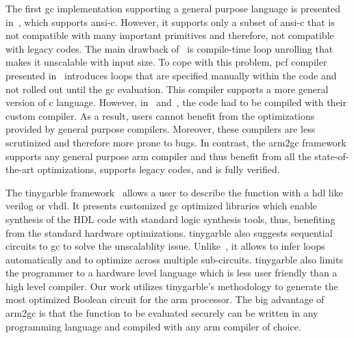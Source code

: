 The first \acrshort{gc} implementation supporting a general purpose language is presented in~\cite{holzer2012secure}, which supports \acrshort{ansi}-\gls{c}.
However, it supports only a subset of \acrshort{ansi}-\gls{c} that is not compatible with many important primitives and therefore, not compatible with legacy codes.
The main drawback of~\cite{holzer2012secure} is compile-time loop unrolling that makes it unscalable with input size.
To cope with this problem, \gls{pcf} compiler presented in~\cite{kreuter2013pcf} introduces loops that are specified manually within the code and not rolled out until the \acrshort{gc} evaluation.
This compiler supports a more general version of \gls{c} language.
However, in~\cite{holzer2012secure} and~\cite{kreuter2013pcf}, the code had to be compiled with their custom compiler.
As a result, users cannot benefit from the optimizations provided by general purpose compilers.
Moreover, these compilers are less scrutinized and therefore more prone to bugs.
In contrast, the \gls{arm2gc} framework supports any general purpose \gls{arm} compiler and thus benefit from all the state-of-the-art optimizations, supports legacy codes, and is fully verified.

The \gls{tinygarble} framework~\cite{songhori2015tinygarble} allows a user to describe the function with a \acrfull{hdl} like \gls{verilog} or \gls{vhdl}.
It presents customized \acrshort{gc} optimized libraries which enable synthesis of the HDL code with standard logic synthesis tools, thus, benefiting from the standard hardware optimizations.
\gls{tinygarble} also suggests sequential circuits to \acrshort{gc} to solve the unscalablity issue.
Unlike~\cite{kreuter2013pcf}, it allows to infer loops automatically and to optimize across multiple sub-circuits.
\gls{tinygarble} also limits the programmer to a hardware level language which is less user friendly than a high level compiler.
Our work utilizes \gls{tinygarble}'s methodology to generate the most optimized Boolean circuit for the \gls{arm} processor.
The big advantage of \gls{arm2gc} is that the function to be evaluated securely can be written in any programming language and compiled with any \gls{arm} compiler of choice.

